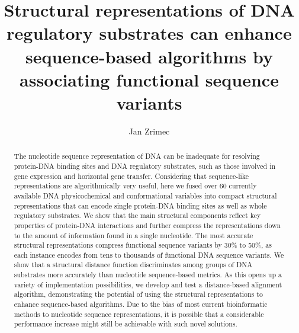 \documentclass[sigconf]{acmart}
\begin{document}
\title{Structural representations of DNA regulatory substrates can enhance sequence-based algorithms by associating functional sequence variants}

\author{Jan Zrimec}

\renewcommand{\shortauthors}{Zrimec J.}

\begin{abstract}
  The nucleotide sequence representation of DNA can be inadequate for resolving protein-DNA binding sites and DNA regulatory substrates, such as those involved in gene expression and horizontal gene transfer. Considering that sequence-like representations are algorithmically very useful, here we fused over 60 currently available DNA physicochemical and conformational variables into compact structural representations that can encode single protein-DNA binding sites as well as whole regulatory substrates. We show that the main structural components reflect key properties of protein-DNA interactions and further compress the representations down to the amount of information found in a single nucleotide. The most accurate structural representations compress functional sequence variants by 30\% to 50\%, as each instance encodes from tens to thousands of functional DNA sequence variants. We show that a structural distance function discriminates among groups of DNA substrates more accurately than nucleotide sequence-based metrics. As this opens up a variety of implementation possibilities, we develop and test a distance-based alignment algorithm, demonstrating the potential of using the structural representations to enhance sequence-based algorithms. Due to the bias of most current bioinformatic methods to nucleotide sequence representations, it is possible that a considerable performance increase might still be achievable with such novel solutions.
\end{abstract}
\end{document}
